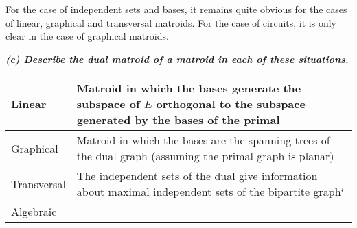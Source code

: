 \vspace{3pt}

For the case of independent sets and bases, it remains quite obvious for the cases of linear, graphical and transversal matroids.
For the case of circuits, it is only clear in the case of graphical matroids.

\vspace{3pt}

\hspace{5pt}\textbf{\textit{(c) Describe the dual matroid of a matroid in each of these situations.}}

\vspace{3pt}

\begin{tabularx}{\textwidth}{X|X}
Linear & Matroid in which the bases generate the subspace of $E$ orthogonal to the subspace generated by the bases of the primal \\ \hline
Graphical & Matroid in which the bases are the spanning trees of the dual graph (assuming the primal graph is planar) \\ \hline
Transversal & The independent sets of the dual give information about maximal independent sets of the bipartite graph`\\ \hline
Algebraic & 
\end{tabularx}